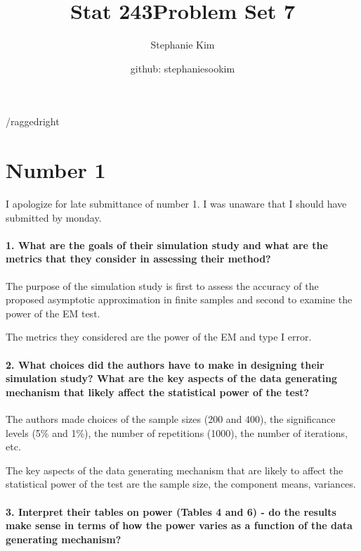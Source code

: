 \documentclass[english]{article}\usepackage[]{graphicx}\usepackage[]{color}
\begin{document}
\title{Stat 243}


\title{Problem Set 7}


\author{Stephanie Kim}


\author{github: stephaniesookim}

\maketitle
/raggedright


\section*{Number 1}

I apologize for late submittance of number 1. I was unaware that I
should have submitted by monday.


\paragraph*{1. What are the goals of their simulation study and what are the
metrics that they consider in assessing their method?}

The purpose of the simulation study is first to assess the accuracy
of the proposed asymptotic approximation in finite samples and second
to examine the power of the EM test.

The metrics they considered are the power of the EM and type I error.


\paragraph*{2. What choices did the authors have to make in designing their simulation
study? What are the key aspects of the data generating mechanism that
likely affect the statistical power of the test?}

The authors made choices of the sample sizes (200 and 400), the significance
levels (5\% and 1\%), the number of repetitions (1000), the number
of iterations, etc.

The key aspects of the data generating mechanism that are likely to
affect the statistical power of the test are the sample size, the
component means, variances.


\paragraph*{3. Interpret their tables on power (Tables 4 and 6) - do the results
make sense in terms of how the power varies as a function of the data
generating mechanism?}
\end{document}
